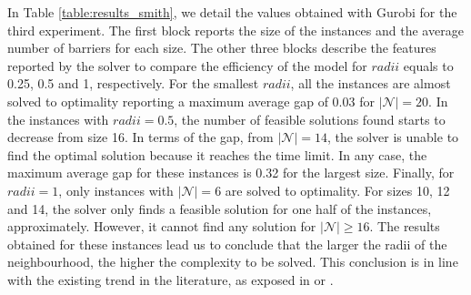 \documentclass[a4paper,  review, authoryear, 1p.]{elsarticle}
\newcommand{\CV}[1]{{\color{red}#1}}
\begin{document}

%

In Table \ref{table:results_smith}, we detail the values obtained with Gurobi for the \CV{third} experiment. The first block reports the size of the instances and the average number of barriers for each size. The other three blocks describe the features reported by the solver to compare the efficiency of the model for $radii$ equals to 0.25, 0.5 and 1, respectively. For the smallest $radii$, all the instances are almost solved to optimality reporting a maximum average gap of 0.03 for $|\mathcal N|=20$. In the instances with $radii=0.5$, the number of feasible solutions found starts to decrease from size 16. In terms of the gap, from $|\mathcal N|=14$, the solver is unable to find the optimal solution because it reaches the time limit. In any case, the maximum average gap for these instances is 0.32 for the largest size. Finally, for $radii=1$, only instances with $|\mathcal N|=6$ are solved to optimality. For sizes 10, 12 and 14, the solver only finds a feasible solution for one half of the instances, approximately. However, it cannot find any solution for $|\mathcal N|\geq 16$. The results obtained for these instances lead us to conclude that the larger the radii of the neighbourhood, the higher the complexity to be solved. This conclusion is in line with the existing trend in the literature, as exposed in \citet{puerto2022c} or \citet{blanco2017}.
\end{document}
